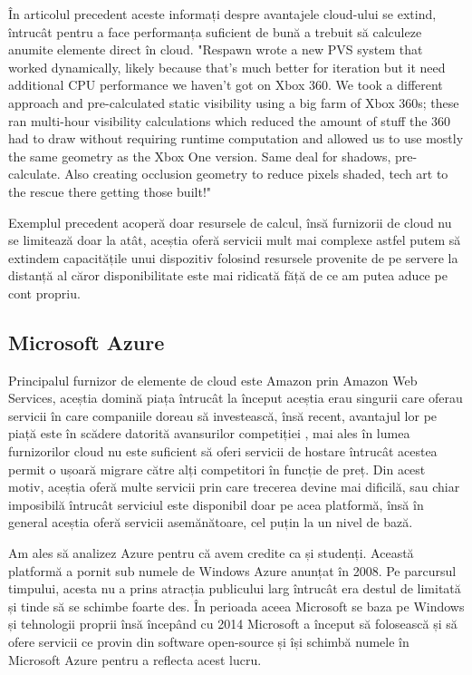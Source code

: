În articolul precedent \cite{leadbetter_2014} aceste informați despre avantajele cloud-ului se extind,
întrucât pentru a face performanța suficient de bună a trebuit să calculeze anumite elemente direct în cloud.
"Respawn wrote a new PVS system that worked dynamically, likely because that's much better for iteration but it need additional CPU performance we haven't got on 
Xbox 360. We took a different approach and pre-calculated static visibility using a 
big farm of Xbox 360s; these ran multi-hour visibility calculations which reduced the 
amount of stuff the 360 had to draw without requiring runtime computation and allowed us 
to use mostly the same geometry as the Xbox One version.
Same deal for shadows, pre-calculate. Also creating occlusion geometry to reduce 
pixels shaded, tech art to the rescue there getting those built!"

Exemplul precedent acoperă doar resursele de calcul, însă furnizorii de cloud nu se limitează doar la atât,
aceștia oferă servicii mult mai complexe astfel putem să extindem capacitățile unui dispozitiv folosind 
resursele provenite de pe servere la distanță al căror disponibilitate este mai ridicată făță de ce
am putea aduce pe cont propriu.


\subsection{Microsoft Azure}

Principalul furnizor de elemente de cloud este Amazon prin Amazon Web Services, aceștia domină piața întrucât la
început aceștia erau singurii care oferau servicii în care companiile doreau să investească, însă recent,
avantajul lor pe piață este în scădere datorită avansurilor competiției \cite{kumar_2022}, mai ales în lumea
furnizorilor cloud nu este suficient să oferi servicii de hostare întrucât acestea permit o ușoară migrare
către alți competitori în funcție de preț. Din acest motiv, aceștia oferă multe servicii prin care
trecerea devine mai dificilă, sau chiar imposibilă întrucât serviciul este disponibil doar
pe acea platformă, însă în general aceștia oferă servicii asemănătoare, cel puțin la
un nivel de bază.

Am ales să analizez Azure pentru că avem credite ca și studenți. Această platformă
a pornit sub numele de Windows Azure anunțat în 2008. Pe parcursul timpului, acesta
nu a prins atracția publicului larg întrucât era destul de limitată și
tinde să se schimbe foarte des. În perioada aceea Microsoft se baza pe Windows și tehnologii
proprii însă începând cu 2014 Microsoft a început să folosească și să ofere servicii
ce provin din software open-source și își schimbă numele în Microsoft Azure pentru
a reflecta acest lucru.

